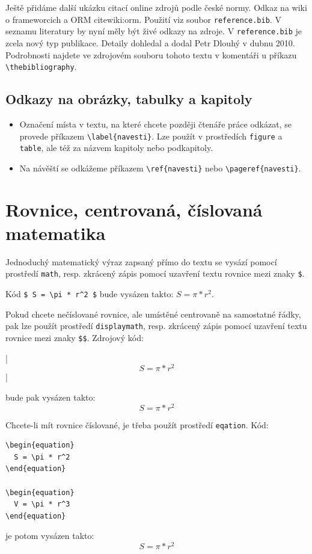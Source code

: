 \documentclass[11pt,twoside,a4paper]{book}
\begin{document}
Ještě přidáme další ukázku citací online zdrojů podle české normy. Odkaz na wiki o frameworcich  a ORM cite{wiki:orm}. Použití viz soubor \verb|reference.bib|. V seznamu literatury by nyní měly být živé odkazy na zdroje. V \verb|reference.bib| je zcela nový typ publikace. Detaily dohledal a dodal Petr Dlouhý v dubnu 2010. Podrobnosti najdete ve zdrojovém souboru tohoto textu v komentáři u příkazu \verb|\thebibliography|.

\subsection{Odkazy na obrázky, tabulky a kapitoly}
\begin{itemize}
\item Označení místa v textu, na které chcete později čtenáře práce odkázat, se provede příkazem \verb|\label{navesti}|. Lze použít v prostředích \verb|figure| a  \verb|table|, ale též za názvem kapitoly nebo podkapitoly.
\item Na návěští se odkážeme příkazem \verb|\ref{navesti}| nebo \verb|\pageref{navesti}|.
\end{itemize}

\section{Rovnice, centrovaná, číslovaná matematika}
Jednoduchý matematický výraz zapsaný přímo do textu se vysází pomocí prostředí \verb|math|, resp. zkrácený zápis pomocí uzavření textu rovnice mezi znaky \verb|$|.

Kód \verb|$ S = \pi * r^2 $| bude vysázen takto: $ S = \pi * r^2 $.

Pokud chcete nečíslované rovnice, ale umístěné centrovaně na samostatné řádky, pak lze použít prostředí \verb|displaymath|, resp. zkrácený zápis pomocí uzavření textu rovnice mezi znaky \verb|$$|. Zdrojový kód: 
\begin{verb}
|$$ S = \pi * r^2 $$|
\end{verb}
bude pak vysázen takto:
$$ S = \pi * r^2 $$

Chcete-li mít rovnice číslované, je třeba použít prostředí \verb|eqation|. Kód:
\begin{verbatim}
\begin{equation}
  S = \pi * r^2
\end{equation}

\begin{equation}
  V = \pi * r^3
\end{equation}
\end{verbatim}
je potom vysázen takto:
\begin{equation}
  S = \pi * r^2
\end{equation}
\end{document}
